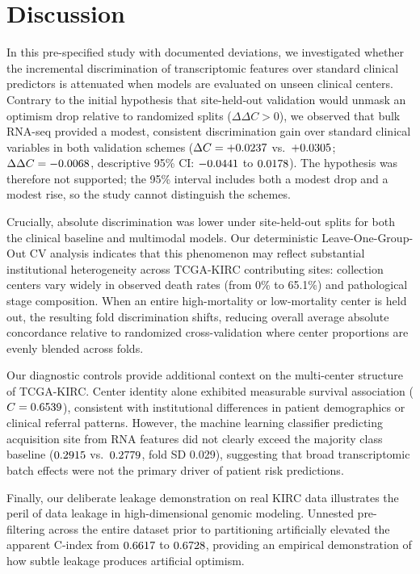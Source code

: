 \documentclass{article}
\begin{document}
\section{Discussion}
In this pre-specified study with documented deviations, we investigated whether the incremental discrimination of transcriptomic features over standard clinical predictors is attenuated when models are evaluated on unseen clinical centers. Contrary to the initial hypothesis that site-held-out validation would unmask an optimism drop relative to randomized splits ($\Delta\Delta C > 0$), we observed that bulk RNA-seq provided a modest, consistent discrimination gain over standard clinical variables in both validation schemes ($\Delta C = +0.0237$ vs.\ $+0.0305$; $\Delta\Delta C = -0.0068$, descriptive 95\% CI: $-0.0441$ to $0.0178$). The hypothesis was therefore not supported; the 95\% interval includes both a modest drop and a modest rise, so the study cannot distinguish the schemes.

Crucially, absolute discrimination was lower under site-held-out splits for both the clinical baseline and multimodal models. Our deterministic Leave-One-Group-Out CV analysis indicates that this phenomenon may reflect substantial institutional heterogeneity across TCGA-KIRC contributing sites: collection centers vary widely in observed death rates (from 0\% to 65.1\%) and pathological stage composition. When an entire high-mortality or low-mortality center is held out, the resulting fold discrimination shifts, reducing overall average absolute concordance relative to randomized cross-validation where center proportions are evenly blended across folds.

Our diagnostic controls provide additional context on the multi-center structure of TCGA-KIRC. Center identity alone exhibited measurable survival association ($C = 0.6539$), consistent with institutional differences in patient demographics or clinical referral patterns. However, the machine learning classifier predicting acquisition site from RNA features did not clearly exceed the majority class baseline ($0.2915$ vs.\ $0.2779$, fold SD 0.029), suggesting that broad transcriptomic batch effects were not the primary driver of patient risk predictions.

Finally, our deliberate leakage demonstration on real KIRC data illustrates the peril of data leakage in high-dimensional genomic modeling. Unnested pre-filtering across the entire dataset prior to partitioning artificially elevated the apparent C-index from $0.6617$ to $0.6728$, providing an empirical demonstration of how subtle leakage produces artificial optimism.
\end{document}
